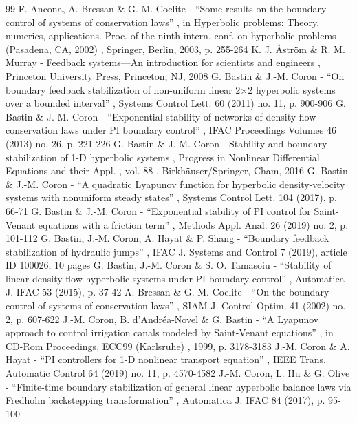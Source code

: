 \documentclass[11pt]{article}
\numberwithin{equation}{section}
\theoremstyle{definition}
\begin{document}
\begin{thebibliography}{99}
 F. Ancona, A. Bressan \& G. M. Coclite - “Some results on the boundary control of systems of conservation laws” , in Hyperbolic problems: Theory, numerics, applications. Proc. of the ninth intern. conf. on hyperbolic problems (Pasadena, CA, 2002) , Springer, Berlin, 2003, p. 255-264
 K. J. Åström \& R. M. Murray - Feedback systems—An introduction for scientists and engineers , Princeton University Press, Princeton, NJ, 2008
 G. Bastin \& J.-M. Coron - “On boundary feedback stabilization of non-uniform linear 2$\times $2 hyperbolic systems over a bounded interval” , Systems Control Lett. 60 (2011) no. 11, p. 900-906
 G. Bastin \& J.-M. Coron - “Exponential stability of networks of density-flow conservation laws under PI boundary control” , IFAC Proceedings Volumes 46 (2013) no. 26, p. 221-226
 G. Bastin \& J.-M. Coron - Stability and boundary stabilization of 1-D hyperbolic systems , Progress in Nonlinear Differential Equations and their Appl. , vol. 88 , Birkhäuser/Springer, Cham, 2016
 G. Bastin \& J.-M. Coron - “A quadratic Lyapunov function for hyperbolic density-velocity systems with nonuniform steady states” , Systems Control Lett. 104 (2017), p. 66-71
 G. Bastin \& J.-M. Coron - “Exponential stability of PI control for Saint-Venant equations with a friction term” , Methods Appl. Anal. 26 (2019) no. 2, p. 101-112
 G. Bastin, J.-M. Coron, A. Hayat \& P. Shang - “Boundary feedback stabilization of hydraulic jumps” , IFAC J. Systems and Control 7 (2019), article ID 100026, 10 pages
 G. Bastin, J.-M. Coron \& S. O. Tamasoiu - “Stability of linear density-flow hyperbolic systems under PI boundary control” , Automatica J. IFAC 53 (2015), p. 37-42
 A. Bressan \& G. M. Coclite - “On the boundary control of systems of conservation laws” , SIAM J. Control Optim. 41 (2002) no. 2, p. 607-622
 J.-M. Coron, B. d’Andréa-Novel \& G. Bastin - “A Lyapunov approach to control irrigation canals modeled by Saint-Venant equations” , in CD-Rom Proceedings, ECC99 (Karlsruhe) , 1999, p. 3178-3183
 J.-M. Coron \& A. Hayat - “PI controllers for 1-D nonlinear transport equation” , IEEE Trans. Automatic Control 64 (2019) no. 11, p. 4570-4582
 J.-M. Coron, L. Hu \& G. Olive - “Finite-time boundary stabilization of general linear hyperbolic balance laws via Fredholm backstepping transformation” , Automatica J. IFAC 84 (2017), p. 95-100

\end{thebibliography}
\end{document}

